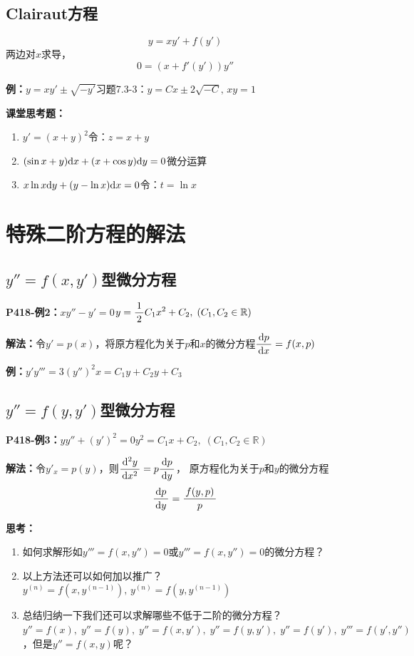 \subsection{Clairaut方程}
$$y=xy'+f(y')$$
两边对$x$求导，
$$0=(x+f'(y'))y''$$

{\bf 例：}$y=xy'\pm\sqrt{-y'}$\hfill 习题7.3-3：$y=Cx\pm2\sqrt{-C},\,xy=1$

\bigskip

{\bf 课堂思考题：}
\begin{enumerate}[(1)]
  \setlength{\itemindent}{1cm}
  \item $y'=(x+y)^2$\hfill 令：$z=x+y$
  \item $(\sin x+y)\mathrm{d} x+(x+\cos y)\mathrm{d} y=0$\hfill 微分运算
  \item $x\ln x\mathrm{d} y+(y-\ln x)\mathrm{d} x=0$\hfill 令：$t=\ln x$
\end{enumerate}

\section{特殊二阶方程的解法}

\subsection{$y''=f(x,y')$型微分方程}

{\bf P418-例2：}$xy''-y'=0$\hfill $y=\displaystyle\frac{\,{1}\,}{\,{2}\,}C_1x^2+C_2,\;(C_1,C_2\in\mathbb{R})$

{\bf 解法：}令$y'=p(x)$，将原方程化为关于$p$和$x$的微分方程$\displaystyle\frac{\,{\mathrm{d} p}\,}{\,{\mathrm{d} x}\,}=f(x,p)$

{\bf 例：}$y'y'''=3(y'')^2$\hfill $x=C_1y+C_2y+C_3$

\subsection{$y''=f(y,y')$型微分方程}

{\bf P418-例3：}$yy''+(y')^2=0$\hfill $y^2=C_1x+C_2,\;(C_1,C_2\in\mathbb{R})$

{\bf 解法：}令$y'_x=p(y)$，则$\displaystyle\frac{\,{\mathrm{d}^2y}\,}{\,{\mathrm{d} x^2}\,}=p\displaystyle\frac{\,{\mathrm{d} p}\,}{\,{\mathrm{d} y}\,}$，
原方程化为关于$p$和$y$的微分方程$$\displaystyle\frac{\,{\mathrm{d} p}\,}{\,{\mathrm{d} y}\,}=\displaystyle\frac{\,{f(y,p)}\,}{\,{p}\,}$$

{\bf 思考：}
\begin{enumerate}[(1)]
  \setlength{\itemindent}{1cm}
  \item 如何求解形如$y'''=f(x,y'')=0$或$y'''=f(x,y'')=0$的微分方程？
  \item 以上方法还可以如何加以推广？\hfill$y^{(n)}=f(x,y^{(n-1)}),
  \,y^{(n)}=f(y,y^{(n-1)})$
  \item 总结归纳一下我们还可以求解哪些不低于二阶的微分方程？\\
  $y''=f(x),\;y''=f(y),\;y''=f(x,y'),\;y''=f(y,y'),
  \;y''=f(y'),\;y'''=f(y',y'')$，但是$y''=f(x,y)$呢？
\end{enumerate}

